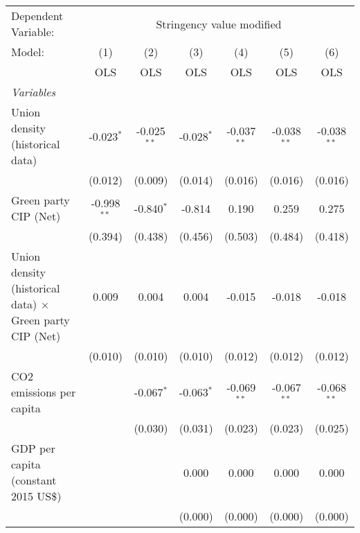 
\begingroup
\centering
\begin{tabular}{lcccccc}
   \toprule
   Dependent Variable: & \multicolumn{6}{c}{Stringency value modified}\\
   Model:                                                          & (1)           & (2)           & (3)          & (4)           & (5)           & (6)\\  
                                                                   &  OLS          & OLS           & OLS          & OLS           & OLS           & OLS\\  
   \midrule
   \emph{Variables}\\
   Union density (historical data)                                 & -0.023$^{*}$  & -0.025$^{**}$ & -0.028$^{*}$ & -0.037$^{**}$ & -0.038$^{**}$ & -0.038$^{**}$\\   
                                                                   & (0.012)       & (0.009)       & (0.014)      & (0.016)       & (0.016)       & (0.016)\\   
   Green party CIP (Net)                                           & -0.998$^{**}$ & -0.840$^{*}$  & -0.814       & 0.190         & 0.259         & 0.275\\   
                                                                   & (0.394)       & (0.438)       & (0.456)      & (0.503)       & (0.484)       & (0.418)\\   
   Union density (historical data) $\times$ Green party CIP (Net)  & 0.009         & 0.004         & 0.004        & -0.015        & -0.018        & -0.018\\   
                                                                   & (0.010)       & (0.010)       & (0.010)      & (0.012)       & (0.012)       & (0.012)\\   
   CO2 emissions per capita                                        &               & -0.067$^{*}$  & -0.063$^{*}$ & -0.069$^{**}$ & -0.067$^{**}$ & -0.068$^{**}$\\   
                                                                   &               & (0.030)       & (0.031)      & (0.023)       & (0.023)       & (0.025)\\   
   GDP per capita (constant 2015 US\$)                             &               &               & 0.000        & 0.000         & 0.000         & 0.000\\   
                                                                   &               &               & (0.000)      & (0.000)       & (0.000)       & (0.000)\\   

\end{tabular}
